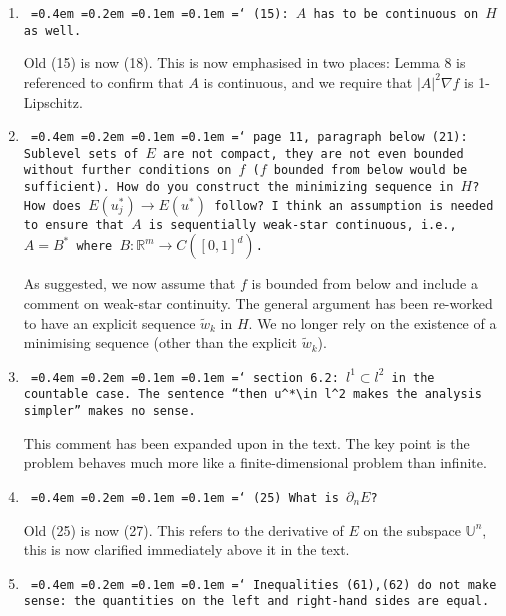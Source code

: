 \documentclass[12pt]{article}
\newcommand*\justify{%
	\fontdimen2\font=0.4em%
	\fontdimen3\font=0.2em%
	\fontdimen4\font=0.1em%
	\fontdimen7\font=0.1em%
	\hyphenchar\font=`\-%
}
\newcommand{\review}[1]{\texttt{\justify{#1}}}
\newcommand{\F}[1]{\mathbb{#1}}
\begin{document}
\begin{enumerate}
	You're absolutely right, Theorem 4 was not consistent with the lemmas in the appendix. We have kept the statement of Theorem 4 the same other than to remove the special case and remove the implicit assumption that $\tilde{\F U}^0$ was finite dimensional (previously part of Definition 2). We have also added a new lemma (Lemma 7) to improve clarity, it serves as a midpoint between Theorem 4 and Appendix B. The text in Appendix B now makes clear reference to Lemma 7 as part of the proof of Theorem 4.
	
	\item \review{(15): $A$ has to be continuous on $H$ as well.}

	Old (15) is now (18). This is now emphasised in two places: Lemma 8 is referenced to confirm that $A$ is continuous, and we require that $|A|^2\nabla f$ is 1-Lipschitz.
	
	\item \review{page 11, paragraph below (21): Sublevel sets of $E$ are not compact, they are not even bounded without further conditions on $f$ ($f$ bounded from below would be sufficient). How do you construct the minimizing sequence in $H$? How does $E(u^*_j) \to E(u^*)$ follow? I think an assumption is needed to ensure that $A$ is sequentially weak-star continuous, i.e., $A = B^*$ where $B : \mathbb{R}^m \to C([0, 1]^d)$.}
	
	As suggested, we now assume that $f$ is bounded from below and include a comment on weak-star continuity. The general argument has been re-worked to have an explicit sequence $\tilde w_k$ in $H$. We no longer rely on the existence of a minimising sequence (other than the explicit $\tilde w_k$).
	
	\item \review{section 6.2: $l^1\subset l^2$ in the countable case. The sentence ``then $u^*\in l^2$ makes the analysis simpler'' makes no sense.}
	
	This comment has been expanded upon in the text. The key point is the problem behaves much more like a finite-dimensional problem than infinite.
	
	\item \review{(25) What is $\partial_n E$?}
	
	Old (25) is now (27). This refers to the derivative of $E$ on the subspace $\F U^n$, this is now clarified immediately above it in the text.
	
	\item \review{Inequalities (61),(62) do not make sense: the quantities on the left and right-hand sides are equal.}
	

\end{enumerate}
\end{document}
